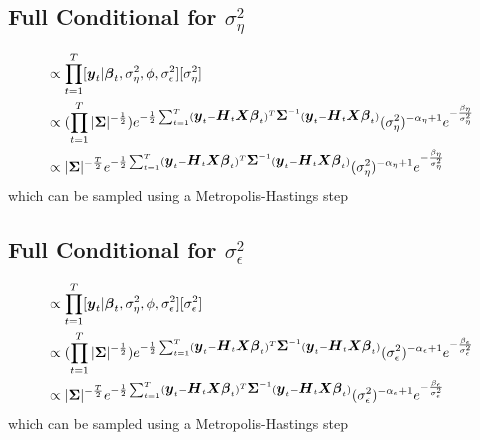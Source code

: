 \documentclass[fleqn]{article}
\def\bm#1{\mbox{\boldmath $#1$}}
\begin{document}
\subsection{Full Conditional for $\sigma^2_\eta$}
%
\begin{align*}
[\sigma^2_\eta | \cdot] & \propto \prod_{t = 1}^T [\bm{y}_t | \bm{\beta}_t, \sigma^2_\eta, \phi, \sigma^2_\epsilon] [\sigma^2_\eta]\\
%
& \propto (\prod_{t = 1}^T |\bm{\Sigma} |^{ - \frac{1} {2}}) e^{ - \frac{1} {2} \sum_{t = 1}^T (\bm{y}_t - \bm{H}_t \bm{X} \bm{\beta}_t)^T \bm{\Sigma}^{ - 1} (\bm{y}_t - \bm{H}_t \bm{X} \bm{\beta}_t)} (\sigma^2_\eta)^{ - \alpha_\eta + 1} e^{ - \frac{\beta_\eta} {\sigma^2_\eta}}\\
%
& \propto |\bm{\Sigma} |^{ - \frac{T} {2}} e^{ - \frac{1} {2} \sum_{t = 1}^T (\bm{y}_t - \bm{H}_t \bm{X} \bm{\beta}_t)^T \bm{\Sigma}^{ - 1} (\bm{y}_t - \bm{H}_t \bm{X} \bm{\beta}_t)} (\sigma^2_\eta)^{ - \alpha_\eta + 1} e^{ - \frac{\beta_\eta} {\sigma^2_\eta}}\\
\end{align*}
% 
which can be sampled using a Metropolis-Hastings step
%
\subsection{Full Conditional for $\sigma^2_\epsilon$}
%
\begin{align*}
[\sigma^2_\epsilon | \cdot] & \propto \prod_{t = 1}^T [\bm{y}_t | \bm{\beta}_t, \sigma^2_\eta, \phi, \sigma^2_\epsilon] [\sigma^2_\epsilon]\\
%
& \propto (\prod_{t = 1}^T |\bm{\Sigma} |^{ - \frac{1} {2}}) e^{ - \frac{1} {2} \sum_{t = 1}^T (\bm{y}_t - \bm{H}_t \bm{X} \bm{\beta}_t)^T \bm{\Sigma}^{ - 1} (\bm{y}_t - \bm{H}_t \bm{X} \bm{\beta}_t)} (\sigma^2_\epsilon)^{ - \alpha_\epsilon + 1} e^{ - \frac{\beta_\epsilon} {\sigma^2_\epsilon}}\\
%
& \propto |\bm{\Sigma} |^{ - \frac{T} {2}} e^{ - \frac{1} {2} \sum_{t = 1}^T (\bm{y}_t - \bm{H}_t \bm{X} \bm{\beta}_t)^T \bm{\Sigma}^{ - 1} (\bm{y}_t - \bm{H}_t \bm{X} \bm{\beta}_t)} (\sigma^2_\epsilon)^{ - \alpha_\epsilon + 1} e^{ - \frac{\beta_\epsilon} {\sigma^2_\epsilon}}\\
\end{align*}
% 
which can be sampled using a Metropolis-Hastings step
%
\end{document}

